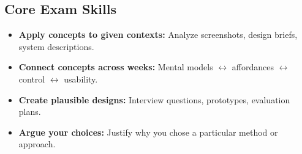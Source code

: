 \subsection*{Core Exam Skills}

\begin{itemize}
  \item \textbf{Apply concepts to given contexts:} Analyze screenshots, design briefs, system descriptions.
  \item \textbf{Connect concepts across weeks:} Mental models $\leftrightarrow$ affordances $\leftrightarrow$ control $\leftrightarrow$ usability.
  \item \textbf{Create plausible designs:} Interview questions, prototypes, evaluation plans.
  \item \textbf{Argue your choices:} Justify why you chose a particular method or approach.
\end{itemize}

